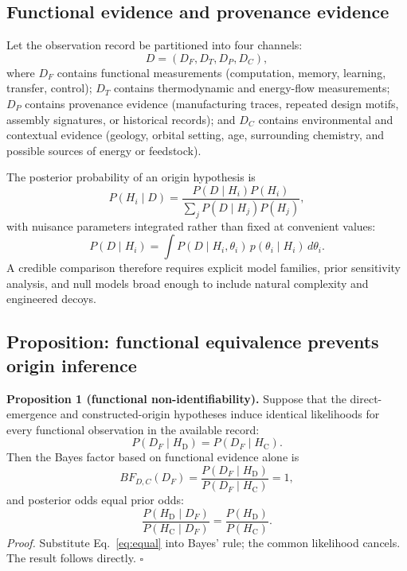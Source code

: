 \documentclass[11pt]{article}
\newcommand{\HD}{H_{\mathrm{D}}}
\newcommand{\HC}{H_{\mathrm{C}}}
\begin{document}
\subsection{Functional evidence and provenance evidence}

Let the observation record be partitioned into four channels:
\begin{equation}
  D=(D_F,D_T,D_P,D_C),
\end{equation}
where $D_F$ contains functional measurements (computation, memory, learning, transfer, control); $D_T$ contains thermodynamic and energy-flow measurements; $D_P$ contains provenance evidence (manufacturing traces, repeated design motifs, assembly signatures, or historical records); and $D_C$ contains environmental and contextual evidence (geology, orbital setting, age, surrounding chemistry, and possible sources of energy or feedstock).

The posterior probability of an origin hypothesis is
\begin{equation}
  P(H_i\mid D)=\frac{P(D\mid H_i)P(H_i)}{\sum_j P(D\mid H_j)P(H_j)},
  \label{eq:bayes}
\end{equation}
with nuisance parameters integrated rather than fixed at convenient values:
\begin{equation}
  P(D\mid H_i)=\int P(D\mid H_i,\theta_i)\,p(\theta_i\mid H_i)\,d\theta_i.
\end{equation}
A credible comparison therefore requires explicit model families, prior sensitivity analysis, and null models broad enough to include natural complexity and engineered decoys.

\subsection{Proposition: functional equivalence prevents origin inference}

\textbf{Proposition 1 (functional non-identifiability).} Suppose that the direct-emergence and constructed-origin hypotheses induce identical likelihoods for every functional observation in the available record:
\begin{equation}
  P(D_F\mid\HD)=P(D_F\mid\HC).
  \label{eq:equal}
\end{equation}
Then the Bayes factor based on functional evidence alone is
\begin{equation}
  BF_{D,C}(D_F)=\frac{P(D_F\mid\HD)}{P(D_F\mid\HC)}=1,
\end{equation}
and posterior odds equal prior odds:
\begin{equation}
  \frac{P(\HD\mid D_F)}{P(\HC\mid D_F)}=
  \frac{P(\HD)}{P(\HC)}.
\end{equation}
\emph{Proof.} Substitute Eq.~\ref{eq:equal} into Bayes' rule; the common likelihood cancels. The result follows directly. \hfill$\square$
\end{document}

